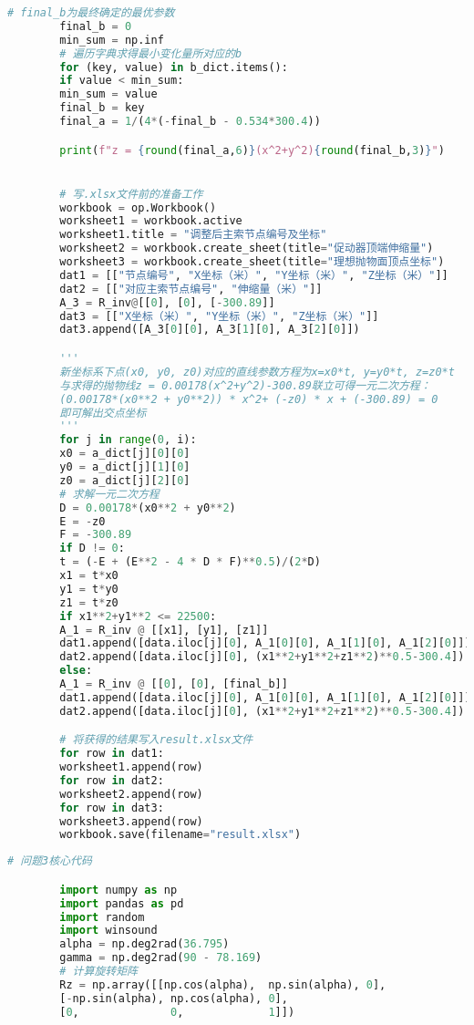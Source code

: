 \documentclass{cumcmthesis}
\begin{document}
\begin{appendices}
\begin{lstlisting}[language={python}]
		# final_b为最终确定的最优参数
		final_b = 0
		min_sum = np.inf
		# 遍历字典求得最小变化量所对应的b
		for (key, value) in b_dict.items():
		if value < min_sum:
		min_sum = value
		final_b = key
		final_a = 1/(4*(-final_b - 0.534*300.4))

		print(f"z = {round(final_a,6)}(x^2+y^2){round(final_b,3)}")


		# 写.xlsx文件前的准备工作
		workbook = op.Workbook()
		worksheet1 = workbook.active
		worksheet1.title = "调整后主索节点编号及坐标"
		worksheet2 = workbook.create_sheet(title="促动器顶端伸缩量")
		worksheet3 = workbook.create_sheet(title="理想抛物面顶点坐标")
		dat1 = [["节点编号", "X坐标（米）", "Y坐标（米）", "Z坐标（米）"]]
		dat2 = [["对应主索节点编号", "伸缩量（米）"]]
		A_3 = R_inv@[[0], [0], [-300.89]]
		dat3 = [["X坐标（米）", "Y坐标（米）", "Z坐标（米）"]]
		dat3.append([A_3[0][0], A_3[1][0], A_3[2][0]])

		'''
		新坐标系下点(x0, y0, z0)对应的直线参数方程为x=x0*t, y=y0*t, z=z0*t
		与求得的抛物线z = 0.00178(x^2+y^2)-300.89联立可得一元二次方程：
		(0.00178*(x0**2 + y0**2)) * x^2+ (-z0) * x + (-300.89) = 0
		即可解出交点坐标
		'''
		for j in range(0, i):
		x0 = a_dict[j][0][0]
		y0 = a_dict[j][1][0]
		z0 = a_dict[j][2][0]
		# 求解一元二次方程
		D = 0.00178*(x0**2 + y0**2)
		E = -z0
		F = -300.89
		if D != 0:
		t = (-E + (E**2 - 4 * D * F)**0.5)/(2*D)
		x1 = t*x0
		y1 = t*y0
		z1 = t*z0
		if x1**2+y1**2 <= 22500:
		A_1 = R_inv @ [[x1], [y1], [z1]]
		dat1.append([data.iloc[j][0], A_1[0][0], A_1[1][0], A_1[2][0]])
		dat2.append([data.iloc[j][0], (x1**2+y1**2+z1**2)**0.5-300.4])
		else:
		A_1 = R_inv @ [[0], [0], [final_b]]
		dat1.append([data.iloc[j][0], A_1[0][0], A_1[1][0], A_1[2][0]])
		dat2.append([data.iloc[j][0], (x1**2+y1**2+z1**2)**0.5-300.4])

		# 将获得的结果写入result.xlsx文件
		for row in dat1:
		worksheet1.append(row)
		for row in dat2:
		worksheet2.append(row)
		for row in dat3:
		worksheet3.append(row)
		workbook.save(filename="result.xlsx")

		\end{lstlisting}  %
		\begin{lstlisting}[language={python}]  
		# 问题3核心代码

		import numpy as np
		import pandas as pd
		import random
		import winsound
		alpha = np.deg2rad(36.795)
		gamma = np.deg2rad(90 - 78.169)
		# 计算旋转矩阵
		Rz = np.array([[np.cos(alpha),  np.sin(alpha), 0],
		[-np.sin(alpha), np.cos(alpha), 0],
		[0,              0,             1]])


\end{lstlisting}
\end{appendices}
\end{document}
